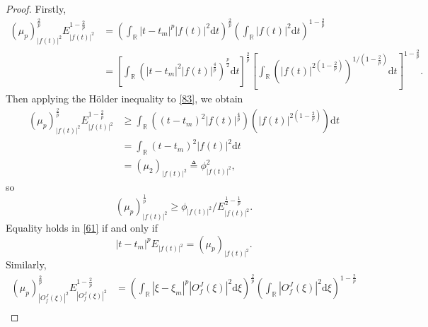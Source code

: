 \documentclass[preprint,12pt]{elsarticle}
\begin{document}
\begin{proof}
	Firstly,
	\begin{equation}
	\label{83}
	\begin{aligned}
	(\mu_{p})_{\left| f(t) \right|^2}^{\frac{2}{p} }E_{\left| f(t) \right|^2}^{1-\frac{2}{p}} &= \left( \int_{\mathbb{R}} \left| t-t_m \right|^{p} \left| f(t) \right|^2 \mathrm{d}t \right)^{\frac{2}{p}} \left( \int_{\mathbb{R}} \left|f(t) \right|^2 \mathrm{d}t \right)^{1-\frac{2}{p}}\\
	&= \left[\int_{\mathbb{R}} \left( \left| t-t_m \right|^{2} \left| f(t) \right|^{\frac{4}{p}} \right) ^{\frac{p}{2}} \mathrm{d}t \right]^{\frac{2}{p}} \left[\int_{\mathbb{R}} \left( \left|f(t) \right|^{2\left(1-\frac{2}{p} \right)} \right)^{1/\left(1-\frac{2}{p} \right)} \mathrm{d}t \right]^{1-\frac{2}{p}}.
	\end{aligned}
	\end{equation}
	Then applying the Hölder inequality to \eqref{83}, we obtain
	\begin{equation*}
	\begin{aligned}
	(\mu_{p})_{\left| f(t) \right|^2}^{\frac{2}{p} }E_{\left| f(t) \right|^2}^{1-\frac{2}{p}} & \ge \int_{\mathbb{R}}  \left( (t-t_m) ^2 \left|f(t) \right|^{\frac{4}{p}} \right) \left(\left|f(t) \right|^{2\left(1-\frac{2}{p} \right) } \right)  \mathrm{d}t\\
	&= \int_{\mathbb{R}} (t-t_m) ^2 \left|f(t) \right|^2 \mathrm{d}t\\
	&= (\mu_{2})_{\left| f(t) \right|^2} \triangleq \phi_{\left|f(t) \right|^2}^2,
	\end{aligned}
	\end{equation*}
	so 
	\begin{equation}
	\label{61}
	(\mu_{p})_{\left| f(t) \right|^2}^{\frac{1}{p}} \ge  \phi_{\left|f(t) \right|^2} / E_{\left| f(t) \right|^2}^{\frac{1}{2}-\frac{1}{p}}.
	\end{equation}
	Equality holds in \eqref{61} if and only if
	\begin{equation*}
	\left| t-t_m \right|^{p} E_{\left| f(t) \right|^2} = (\mu_{p})_{\left| f(t) \right|^2}.
	\end{equation*}
	Similarly, 
	\begin{equation*}
	\begin{aligned}
	(\mu_{p})_{\left| O_f^J(\xi) \right|^2}^{\frac{2}{p} } E_{\left| O_f^J(\xi) \right|^2}^{1-\frac{2}{p}} &= \left( \int_{\mathbb{R}} \left| \xi-\xi_m \right|^{p} \left| O_f^J(\xi) \right|^2 \mathrm{d} \xi \right)^{\frac{2}{p}} \left( \int_{\mathbb{R}} \left| O_f^J (\xi) \right|^2 \mathrm{d}\xi \right)^{1-\frac{2}{p}} \\

\end{aligned}
\end{equation*}
\end{proof}
\end{document}
